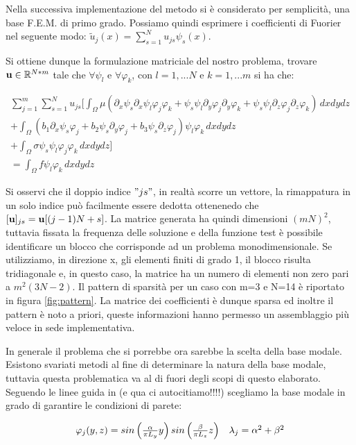  Nella successiva implementazione del metodo si \`e considerato per semplicit\`a, una base F.E.M. di primo grado. Possiamo quindi esprimere i coefficienti di Fuorier nel seguente modo: $\tilde{u}_j(x)=\sum_{s=1}^Nu_{js}\psi_s(x)$. 
 
 Si ottiene dunque la formulazione matriciale del nostro problema, trovare $\mathbf{u} \in \mathbb{R}^{N*m}$ tale che $\forall \psi_l$ e $\forall \varphi_k$, con $l=1,...N$ e $k=1,...m$ si ha che:

\begin{multline}
\sum_{j=1}^m \sum_{s=1}^N
u_{js} \Bigg[ \int_\Omega\mu( \partial_x\psi_s \partial_x\psi_l\varphi _j\varphi _k + \psi_s \psi_l \partial_y\varphi _j\partial_y\varphi _k + \psi_s \psi_l \partial_z\varphi _j\partial_z\varphi _k)\,dxdydz \\
+ \int_\Omega (b_1\partial_x\psi_s\varphi _j+b_2\psi_s\partial_y\varphi _j + b_3\psi_s\partial_z\varphi_j)\psi_l\varphi _k\,dxdydz\\ 
+\int_\Omega \sigma\psi_s\psi_l\varphi _j\varphi _k\,dxdydz \Bigg]\\
=\int_\Omega f\psi_l\varphi _k\,dxdydz
\end{multline}

 Si osservi che il doppio indice $"js"$, in realt\`a scorre un vettore, la rimappatura in un solo indice pu\`o 
 facilmente essere dedotta ottenenedo che $[\mathbf{u}]_{js}=\mathbf{u}[(j-1)N+s]$. 
 La matrice generata ha quindi dimensioni $(mN)^2$, tuttavia fissata la frequenza delle soluzione e della funzione test \`e 
 possibile identificare un blocco che corrisponde ad un problema monodimensionale.
 Se utilizziamo, in direzione x, gli elementi finiti di grado 1, il blocco risulta tridiagonale e, in questo caso, la matrice ha un numero 
 di elementi non zero pari a $m^2(3N-2)$. Il pattern di sparsit\`a per un caso con m=3 e N=14 \`e riportato in figura \ref{fig:pattern}.
 La matrice dei coefficienti \`e dunque sparsa ed inoltre il pattern \`e noto a priori, queste 
 informazioni hanno permesso un assemblaggio pi\`u veloce in sede implementativa. 

In generale il problema che si porrebbe ora sarebbe la scelta della base modale. Esistono svariati metodi al fine di determinare la natura della base modale, tuttavia questa problematica va al di fuori degli scopi di questo elaborato. Seguendo le linee guida in (e qua ci autocitiamo!!!!) scegliamo la base modale in grado di garantire le condizioni di parete:

\begin{equation}
\label{eq:base modale}
\begin{array}{c c}
\varphi_j(y,z)=sin\left(\frac{\alpha}{\pi L_y}y\right)sin\left(\frac{\beta}{\pi L_z}z\right)
&
\lambda_j=\alpha^2+\beta^2
\end{array}
\end{equation}


